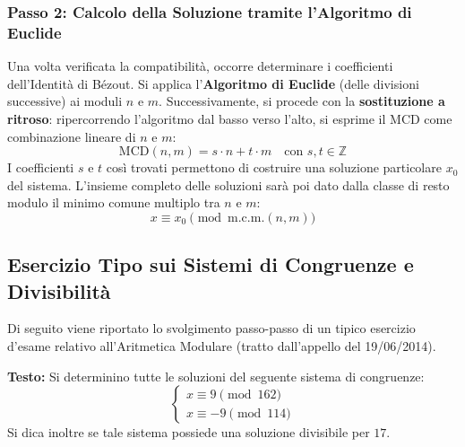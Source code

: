 \documentclass[12pt, a4paper]{article}
\begin{document}
\subsubsection*{Passo 2: Calcolo della Soluzione tramite l'Algoritmo di Euclide}
Una volta verificata la compatibilità, occorre determinare i coefficienti dell'Identità di Bézout. Si applica l'\textbf{Algoritmo di Euclide} (delle divisioni successive) ai moduli $n$ e $m$. 
Successivamente, si procede con la \textbf{sostituzione a ritroso}: ripercorrendo l'algoritmo dal basso verso l'alto, si esprime il MCD come combinazione lineare di $n$ e $m$:
\[ \text{MCD}(n, m) = s \cdot n + t \cdot m \quad \text{con } s, t \in \mathbb{Z} \]
I coefficienti $s$ e $t$ così trovati permettono di costruire una soluzione particolare $x_0$ del sistema. L'insieme completo delle soluzioni sarà poi dato dalla classe di resto modulo il minimo comune multiplo tra $n$ e $m$:
\[ x \equiv x_0 \pmod{\text{m.c.m.}(n, m)} \]

\subsection{Esercizio Tipo sui Sistemi di Congruenze e Divisibilità}
Di seguito viene riportato lo svolgimento passo-passo di un tipico esercizio d'esame relativo all'Aritmetica Modulare (tratto dall'appello del 19/06/2014).

\textbf{Testo:} 
Si determinino tutte le soluzioni del seguente sistema di congruenze:
\[
\begin{cases}
    x \equiv 9 \pmod{162} \\
    x \equiv -9 \pmod{114}
\end{cases}
\]
Si dica inoltre se tale sistema possiede una soluzione divisibile per $17$.
\end{document}
